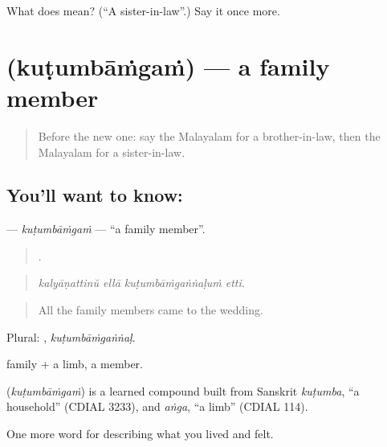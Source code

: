 \begin{tcolorbox}[breakable,colback=teal!4,colframe=teal!35!black,title={Before you move on}]
What does  mean? (\textquotedblleft{}A sister-in-law\textquotedblright{}.) Say it once more.
\end{tcolorbox}
\section[\texorpdfstring{\ml{കുടുംബാംഗം} (kuṭumbāṁgaṁ)}{കുടുംബാംഗം (kuṭumbāṁgaṁ)}]{ (kuṭumbāṁgaṁ) — a family member}

\label{lesson:ML-C554-kutumbamgam}



\begin{quote}
Before the new one: say the Malayalam for a brother-in-law, then the Malayalam for a sister-in-law.
\end{quote}

\subsection*{You'll want to know: }
\textbf{} — \emph{kuṭumbāṁgaṁ} — \textquotedblleft{}a family member\textquotedblright{}.

\begin{quote}
   .
\end{quote}

\begin{quote}
\emph{kalyāṇattinŭ ellā kuṭumbāṁgaṅṅaḷuṁ etti.}
\end{quote}

\begin{quote}
All the family members came to the wedding.
\end{quote}

Plural: , \emph{kuṭumbāṁgaṅṅaḷ}.

 family +  a limb, a member.

\begin{cousinweb}
\textbf{} (\emph{kuṭumbāṁgaṁ}) is a learned compound built from Sanskrit \emph{kuṭumba}, \textquotedblleft{}a household\textquotedblright{} (CDIAL 3233), and \emph{aṅga}, \textquotedblleft{}a limb\textquotedblright{} (CDIAL 114).
\end{cousinweb}

\begin{grammarlens}[title={What you've built}]
One more word for describing what you lived and felt.
\end{grammarlens}

